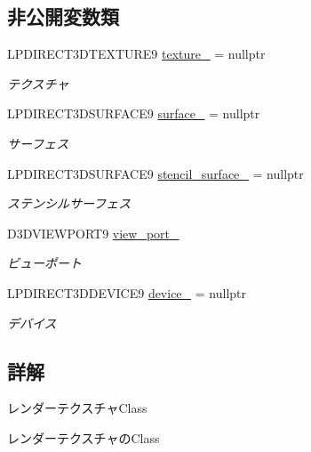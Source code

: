 \subsection*{非公開変数類}
\begin{DoxyCompactItemize}
\item 
L\+P\+D\+I\+R\+E\+C\+T3\+D\+T\+E\+X\+T\+U\+R\+E9 \mbox{\hyperlink{class_render_texture_aea3e80136ac664bc20ddc0d66007076b}{texture\+\_\+}} = nullptr
\begin{DoxyCompactList}\small\item\em テクスチャ \end{DoxyCompactList}\item 
L\+P\+D\+I\+R\+E\+C\+T3\+D\+S\+U\+R\+F\+A\+C\+E9 \mbox{\hyperlink{class_render_texture_a8bf64187c35b11241c1e167d64a0602e}{surface\+\_\+}} = nullptr
\begin{DoxyCompactList}\small\item\em サーフェス \end{DoxyCompactList}\item 
L\+P\+D\+I\+R\+E\+C\+T3\+D\+S\+U\+R\+F\+A\+C\+E9 \mbox{\hyperlink{class_render_texture_aa13ba6441d4d29d5e9fa78348b1d0b63}{stencil\+\_\+surface\+\_\+}} = nullptr
\begin{DoxyCompactList}\small\item\em ステンシルサーフェス \end{DoxyCompactList}\item 
D3\+D\+V\+I\+E\+W\+P\+O\+R\+T9 \mbox{\hyperlink{class_render_texture_a40f181cab9d298d58868929d6cf28cd8}{view\+\_\+port\+\_\+}}
\begin{DoxyCompactList}\small\item\em ビューポート \end{DoxyCompactList}\item 
L\+P\+D\+I\+R\+E\+C\+T3\+D\+D\+E\+V\+I\+C\+E9 \mbox{\hyperlink{class_render_texture_aed11b2bbf0972d9d20bbb59d1a28c2f2}{device\+\_\+}} = nullptr
\begin{DoxyCompactList}\small\item\em デバイス \end{DoxyCompactList}\end{DoxyCompactItemize}


\subsection{詳解}
レンダーテクスチャ\+Class 

レンダーテクスチャの\+Class 


